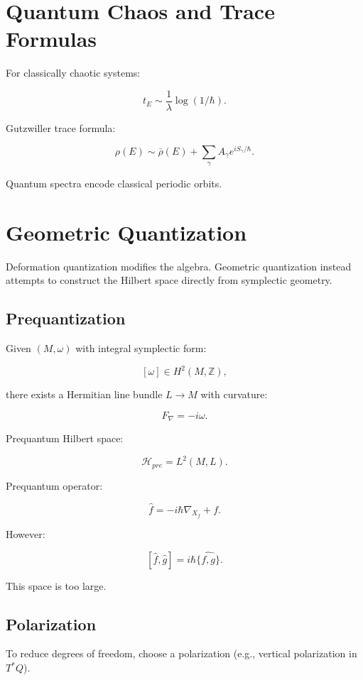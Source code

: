 \documentclass[11pt,a4paper]{article}
\begin{document}
\section{Quantum Chaos and Trace Formulas}

For classically chaotic systems:

\[
t_E \sim \frac{1}{\lambda}\log(1/\hbar).
\]

Gutzwiller trace formula:

\[
\rho(E)
\sim
\bar\rho(E)
+
\sum_\gamma
A_\gamma e^{iS_\gamma/\hbar}.
\]

Quantum spectra encode classical periodic orbits.

\section{Geometric Quantization}

Deformation quantization modifies the algebra. 
Geometric quantization instead attempts to construct the Hilbert space 
directly from symplectic geometry.

\subsection{Prequantization}

Given $(M,\omega)$ with integral symplectic form:

\[
[\omega] \in H^2(M,\mathbb Z),
\]

there exists a Hermitian line bundle $L \to M$ with curvature:

\[
F_\nabla = -i\omega.
\]

Prequantum Hilbert space:

\[
\mathcal H_{pre} = L^2(M,L).
\]

Prequantum operator:

\[
\hat f = -i\hbar \nabla_{X_f} + f.
\]

However:

\[
[\hat f, \hat g] = i\hbar \widehat{\{f,g\}}.
\]

This space is too large.

\subsection{Polarization}

To reduce degrees of freedom, choose a polarization 
(e.g., vertical polarization in $T^*Q$). 
\end{document}
